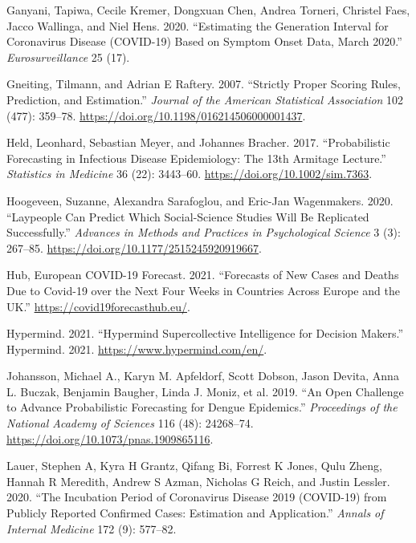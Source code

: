 \documentclass[
]{article}
\newlength{\cslhangindent}
\newlength{\cslentryspacingunit} %
\newenvironment{CSLReferences}[2] %
 {%
  \setlength{\parindent}{0pt}
  \ifodd #1
  \let\oldpar\par
  \def\par{\hangindent=\cslhangindent\oldpar}
  \fi
  \setlength{\parskip}{#2\cslentryspacingunit}
 }%
 {}
\begin{document}
\begin{CSLReferences}{1}{0}
\leavevmode{}%
Ganyani, Tapiwa, Cecile Kremer, Dongxuan Chen, Andrea Torneri, Christel Faes, Jacco Wallinga, and Niel Hens. 2020. {``Estimating the Generation Interval for Coronavirus Disease (COVID-19) Based on Symptom Onset Data, March 2020.''} \emph{Eurosurveillance} 25 (17).

\leavevmode{}%
Gneiting, Tilmann, and Adrian E Raftery. 2007. {``Strictly Proper Scoring Rules, Prediction, and Estimation.''} \emph{Journal of the American Statistical Association} 102 (477): 359--78. \url{https://doi.org/10.1198/016214506000001437}.

\leavevmode{}%
Held, Leonhard, Sebastian Meyer, and Johannes Bracher. 2017. {``Probabilistic Forecasting in Infectious Disease Epidemiology: The 13th {Armitage} Lecture.''} \emph{Statistics in Medicine} 36 (22): 3443--60. \url{https://doi.org/10.1002/sim.7363}.

\leavevmode{}%
Hoogeveen, Suzanne, Alexandra Sarafoglou, and Eric-Jan Wagenmakers. 2020. {``Laypeople {Can Predict Which Social}-{Science Studies Will Be Replicated Successfully}.''} \emph{Advances in Methods and Practices in Psychological Science} 3 (3): 267--85. \url{https://doi.org/10.1177/2515245920919667}.

\leavevmode{}%
Hub, European COVID-19 Forecast. 2021. {``Forecasts of New Cases and Deaths Due to Covid-19 over the Next Four Weeks in Countries Across Europe and the UK.''} \url{https://covid19forecasthub.eu/}.

\leavevmode{}%
Hypermind. 2021. {``Hypermind \textbar{} {Supercollective} Intelligence for Decision Makers.''} {Hypermind}. 2021. \url{https://www.hypermind.com/en/}.

\leavevmode{}%
Johansson, Michael A., Karyn M. Apfeldorf, Scott Dobson, Jason Devita, Anna L. Buczak, Benjamin Baugher, Linda J. Moniz, et al. 2019. {``An Open Challenge to Advance Probabilistic Forecasting for Dengue Epidemics.''} \emph{Proceedings of the National Academy of Sciences} 116 (48): 24268--74. \url{https://doi.org/10.1073/pnas.1909865116}.

\leavevmode{}%
Lauer, Stephen A, Kyra H Grantz, Qifang Bi, Forrest K Jones, Qulu Zheng, Hannah R Meredith, Andrew S Azman, Nicholas G Reich, and Justin Lessler. 2020. {``The Incubation Period of Coronavirus Disease 2019 (COVID-19) from Publicly Reported Confirmed Cases: Estimation and Application.''} \emph{Annals of Internal Medicine} 172 (9): 577--82.


\end{CSLReferences}
\end{document}
